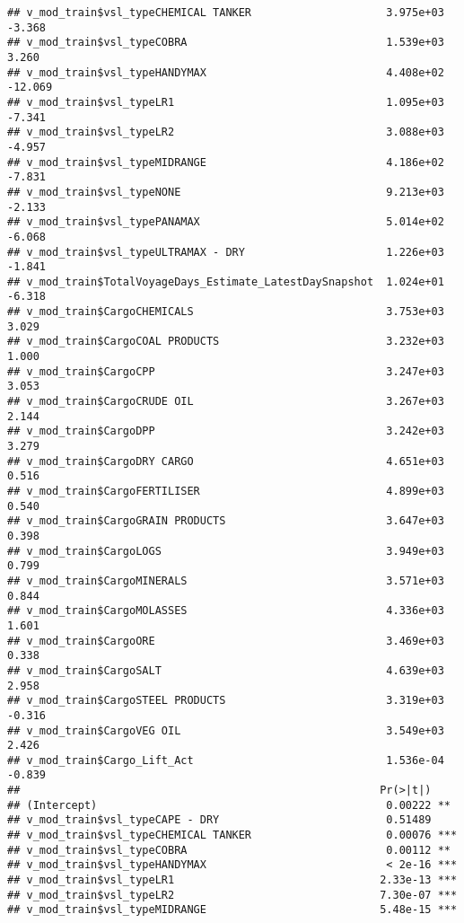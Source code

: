 \documentclass[]{article}
\begin{document}
\begin{verbatim}
## v_mod_train$vsl_typeCHEMICAL TANKER                     3.975e+03  -3.368
## v_mod_train$vsl_typeCOBRA                               1.539e+03   3.260
## v_mod_train$vsl_typeHANDYMAX                            4.408e+02 -12.069
## v_mod_train$vsl_typeLR1                                 1.095e+03  -7.341
## v_mod_train$vsl_typeLR2                                 3.088e+03  -4.957
## v_mod_train$vsl_typeMIDRANGE                            4.186e+02  -7.831
## v_mod_train$vsl_typeNONE                                9.213e+03  -2.133
## v_mod_train$vsl_typePANAMAX                             5.014e+02  -6.068
## v_mod_train$vsl_typeULTRAMAX - DRY                      1.226e+03  -1.841
## v_mod_train$TotalVoyageDays_Estimate_LatestDaySnapshot  1.024e+01  -6.318
## v_mod_train$CargoCHEMICALS                              3.753e+03   3.029
## v_mod_train$CargoCOAL PRODUCTS                          3.232e+03   1.000
## v_mod_train$CargoCPP                                    3.247e+03   3.053
## v_mod_train$CargoCRUDE OIL                              3.267e+03   2.144
## v_mod_train$CargoDPP                                    3.242e+03   3.279
## v_mod_train$CargoDRY CARGO                              4.651e+03   0.516
## v_mod_train$CargoFERTILISER                             4.899e+03   0.540
## v_mod_train$CargoGRAIN PRODUCTS                         3.647e+03   0.398
## v_mod_train$CargoLOGS                                   3.949e+03   0.799
## v_mod_train$CargoMINERALS                               3.571e+03   0.844
## v_mod_train$CargoMOLASSES                               4.336e+03   1.601
## v_mod_train$CargoORE                                    3.469e+03   0.338
## v_mod_train$CargoSALT                                   4.639e+03   2.958
## v_mod_train$CargoSTEEL PRODUCTS                         3.319e+03  -0.316
## v_mod_train$CargoVEG OIL                                3.549e+03   2.426
## v_mod_train$Cargo_Lift_Act                              1.536e-04  -0.839
##                                                        Pr(>|t|)    
## (Intercept)                                             0.00222 ** 
## v_mod_train$vsl_typeCAPE - DRY                          0.51489    
## v_mod_train$vsl_typeCHEMICAL TANKER                     0.00076 ***
## v_mod_train$vsl_typeCOBRA                               0.00112 ** 
## v_mod_train$vsl_typeHANDYMAX                            < 2e-16 ***
## v_mod_train$vsl_typeLR1                                2.33e-13 ***
## v_mod_train$vsl_typeLR2                                7.30e-07 ***
## v_mod_train$vsl_typeMIDRANGE                           5.48e-15 ***

\end{verbatim}
\end{document}

